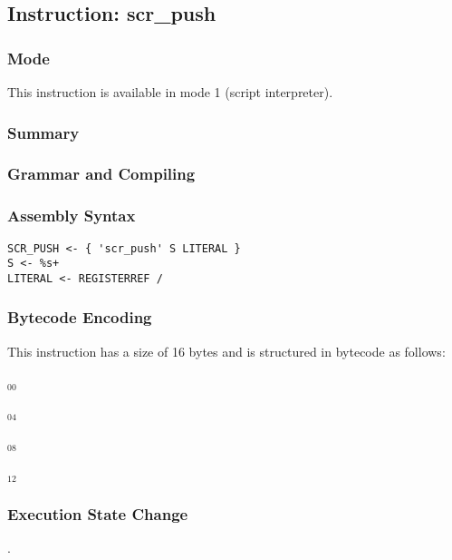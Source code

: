 \subsection{Instruction: scr\_push}

\subsubsection{Mode}
This instruction is available in mode 1 (script interpreter).
\subsubsection{Summary}


\subsubsection{Grammar and Compiling}


\subsubsection{Assembly Syntax}

\begin{myquote}
\begin{verbatim}
SCR_PUSH <- { 'scr_push' S LITERAL }
S <- %s+
LITERAL <- REGISTERREF /
\end{verbatim}
\end{myquote}

\subsubsection{Bytecode Encoding}

This instruction has a size of 16 bytes and is structured in bytecode as follows:

$_{00}$\ 



$_{04}$\ 



$_{08}$\ 



$_{12}$\ 
\fbox{%
  \parbox{20pt}{%
00
  }%
}

\subsubsection{Execution State Change}

.


